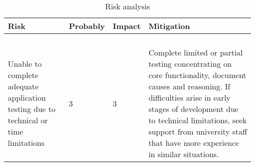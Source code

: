 \def\riskaaaaa{Unable to complete adequate application testing due to technical or time limitations}
\def \probabilityaaaaa {3}
\def \impactaaaaa {3}
\def \mitigationaaaaa {Complete limited or partial testing concentrating on core functionality, document causes and reasoning. If difficulties arise in early stages of development  due to technical limitations, seek support from university staff that have more experience in similar situations. }

\begin{table}
	\centering
	\begin{tabular}{ |m{5cm}|m{2cm}|m{1cm}|m{6cm}| } 
		\hline
		Risk & Probably & Impact & Mitigation \\ 
		\hline
		\riska & \probabilitya & \impacta & \mitigationa \\ 
		\hline
		\riskaa & \probabilityaa & \impactaa & \mitigationaa \\ 
		\hline
		\riskaaa & \probabilityaaa & \impactaaa & \mitigationaaa \\ 
		\hline
		\riskaaaa & \probabilityaaaa & \impactaaaa & \mitigationaaaa \\ 
		\hline
		\riskaaaaa & \probabilityaaaaa & \impactaaaaa & \mitigationaaaaa \\ 
		\hline
	\end{tabular}
	\caption{\label{tab:risk_ana} Risk analysis}
\end{table}